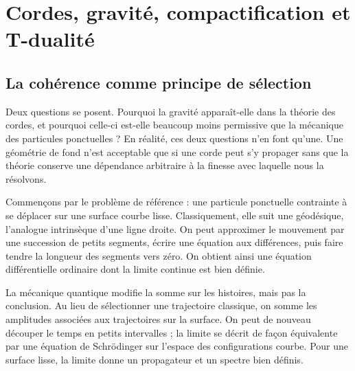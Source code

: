 \chapter{Cordes, gravité, compactification et T-dualité}


\section{La cohérence comme principe de sélection}

Deux questions se posent. Pourquoi la gravité apparaît-elle dans la théorie des cordes, et pourquoi celle-ci est-elle beaucoup moins permissive que la mécanique des particules ponctuelles ? En réalité, ces deux questions n’en font qu’une. Une géométrie de fond n’est acceptable que si une corde peut s’y propager sans que la théorie conserve une dépendance arbitraire à la finesse avec laquelle nous la résolvons.

Commençons par le problème de référence : une particule ponctuelle contrainte à se déplacer sur une surface courbe lisse. Classiquement, elle suit une géodésique, l’analogue intrinsèque d’une ligne droite. On peut approximer le mouvement par une succession de petits segments, écrire une équation aux différences, puis faire tendre la longueur des segments vers zéro. On obtient ainsi une équation différentielle ordinaire dont la limite continue est bien définie.

La mécanique quantique modifie la somme sur les histoires, mais pas la conclusion. Au lieu de sélectionner une trajectoire classique, on somme les amplitudes associées aux trajectoires sur la surface. On peut de nouveau découper le temps en petits intervalles ; la limite se décrit de façon équivalente par une équation de Schr\"odinger sur l’espace des configurations courbe. Pour une surface lisse, la limite donne un propagateur et un spectre bien définis.

